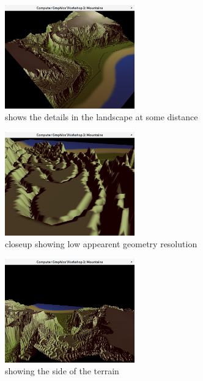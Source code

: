\documentclass[a4paper, 11pt]{article} %
\begin{document}
\begin{figure}[ht]
\caption{shows the details in the landscape at some distance}
\centering
\includegraphics[width=0.5\textwidth]{landscape}
\end{figure}



\begin{figure}[ht]
\caption{closeup showing low appearent geometry resolution}
\centering
\includegraphics[width=0.5\textwidth]{shows_gradient}
\end{figure}



\begin{figure}[ht]
\caption{showing the side of the terrain}
\centering
\includegraphics[width=0.5\textwidth]{side_view}
\end{figure}
\end{document}
